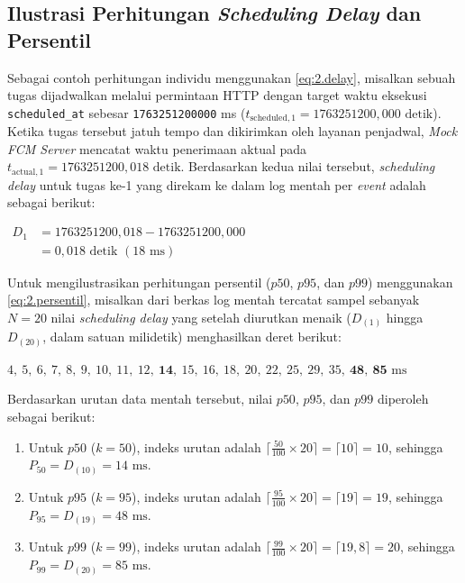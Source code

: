\subsection{Ilustrasi Perhitungan \textit{Scheduling Delay} dan Persentil} \label{III.Ilustrasi_Delay}
Sebagai contoh perhitungan individu menggunakan \ref{eq:2.delay}, misalkan sebuah tugas dijadwalkan melalui permintaan HTTP dengan target waktu eksekusi \texttt{scheduled\_at} sebesar \texttt{1763251200000} ms ($t_{\text{scheduled}, 1} = 1763251200{,}000\text{ detik}$). Ketika tugas tersebut jatuh tempo dan dikirimkan oleh layanan penjadwal, \textit{Mock FCM Server} mencatat waktu penerimaan aktual pada $t_{\text{actual}, 1} = 1763251200{,}018\text{ detik}$. Berdasarkan kedua nilai tersebut, \textit{scheduling delay} untuk tugas ke-1 yang direkam ke dalam log mentah per \textit{event} adalah sebagai berikut: \par
\vspace{8pt}
\begin{center}
$\displaystyle \begin{aligned}
    D_1 &= 1763251200{,}018 - 1763251200{,}000 \\
        &= 0{,}018\text{ detik } (18\text{ ms})
\end{aligned}$
\end{center}
\vspace{8pt}

Untuk mengilustrasikan perhitungan persentil ($p50$, $p95$, dan $p99$) menggunakan \ref{eq:2.persentil}, misalkan dari berkas log mentah tercatat sampel sebanyak $N = 20$ nilai \textit{scheduling delay} yang setelah diurutkan menaik ($D_{(1)}$ hingga $D_{(20)}$, dalam satuan milidetik) menghasilkan deret berikut: \par
\vspace{8pt}
\begin{center}
$4,\ 5,\ 6,\ 7,\ 8,\ 9,\ 10,\ 11,\ 12,\ \mathbf{14},\ 15,\ 16,\ 18,\ 20,\ 22,\ 25,\ 29,\ 35,\ \mathbf{48},\ \mathbf{85}\text{ ms}$
\end{center}
\vspace{8pt}

Berdasarkan urutan data mentah tersebut, nilai $p50$, $p95$, dan $p99$ diperoleh sebagai berikut: \par
\begin{enumerate}[noitemsep]
	\item Untuk $p50$ ($k = 50$), indeks urutan adalah $\lceil \frac{50}{100} \times 20 \rceil = \lceil 10 \rceil = 10$, sehingga $P_{50} = D_{(10)} = 14\text{ ms}$.
	\item Untuk $p95$ ($k = 95$), indeks urutan adalah $\lceil \frac{95}{100} \times 20 \rceil = \lceil 19 \rceil = 19$, sehingga $P_{95} = D_{(19)} = 48\text{ ms}$.
	\item Untuk $p99$ ($k = 99$), indeks urutan adalah $\lceil \frac{99}{100} \times 20 \rceil = \lceil 19{,}8 \rceil = 20$, sehingga $P_{99} = D_{(20)} = 85\text{ ms}$.
\end{enumerate}

